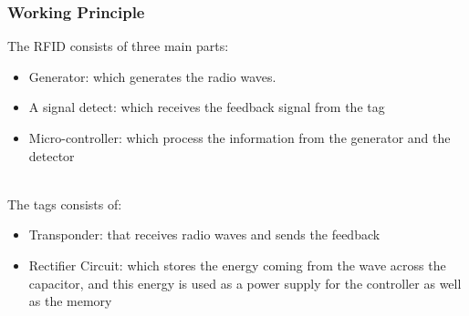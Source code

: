 \subsubsection{Working Principle}
The RFID consists of three main parts:
	\begin{itemize}
		\item Generator: which generates the radio waves.
		\item A signal detect: which receives the feedback signal from the tag
		\item Micro-controller: which process the information from the generator and the detector\\
		\\
	\end{itemize}
The tags consists of:
	\begin{itemize}
		\item Transponder: that receives radio waves and sends the feedback
		\item Rectifier Circuit: which stores the energy coming from the wave across the capacitor, and this energy is used as a power supply for the controller as well as the memory
	\end{itemize}

